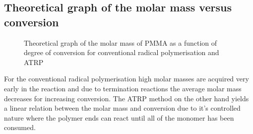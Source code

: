 \subsection{Theoretical graph of the molar mass versus conversion}

\begin{figure}[H]
    \centering
    \caption{Theoretical graph of the molar mass of PMMA as a function of degree of conversion for conventional radical polymerisation and ATRP}
\end{figure}

For the conventional radical polymerisation high molar masses are acquired very 
early in the reaction and due to termination reactions the average molar mass decreases 
for increasing conversion. The ATRP method on the other hand yields a linear relation between the molar mass 
and conversion due to it's controlled nature where the polymer ends can react until all of the monomer has 
been consumed.

    
